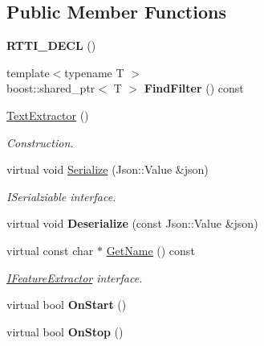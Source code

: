 \subsection*{Public Member Functions}
\begin{DoxyCompactItemize}
\item 
\mbox{\label{class_text_extractor_aa683fd90846e980a8fe1f398a93c5c96}} 
{\bfseries R\+T\+T\+I\+\_\+\+D\+E\+CL} ()
\item 
\mbox{\label{class_text_extractor_a918f1efb0112c641aa77057f6a618f90}} 
{\footnotesize template$<$typename T $>$ }\\boost\+::shared\+\_\+ptr$<$ T $>$ {\bfseries Find\+Filter} () const
\item 
\mbox{\label{class_text_extractor_aa42892751754454934baa10bab2ad9f3}} 
\hyperlink{class_text_extractor_aa42892751754454934baa10bab2ad9f3}{Text\+Extractor} ()
\begin{DoxyCompactList}\small\item\em Construction. \end{DoxyCompactList}\item 
\mbox{\label{class_text_extractor_a8e5b4a68bc0c81bd0c87acf280c210a3}} 
virtual void \hyperlink{class_text_extractor_a8e5b4a68bc0c81bd0c87acf280c210a3}{Serialize} (Json\+::\+Value \&json)
\begin{DoxyCompactList}\small\item\em I\+Serialziable interface. \end{DoxyCompactList}\item 
\mbox{\label{class_text_extractor_a638a7f09a4083d703c384f1c6aaa7bb3}} 
virtual void {\bfseries Deserialize} (const Json\+::\+Value \&json)
\item 
\mbox{\label{class_text_extractor_aa47be2f759d68326f3a55cd318db6360}} 
virtual const char $\ast$ \hyperlink{class_text_extractor_aa47be2f759d68326f3a55cd318db6360}{Get\+Name} () const
\begin{DoxyCompactList}\small\item\em \hyperlink{class_i_feature_extractor}{I\+Feature\+Extractor} interface. \end{DoxyCompactList}\item 
\mbox{\label{class_text_extractor_a875edec706a2cb1646b2524c03e88cd8}} 
virtual bool {\bfseries On\+Start} ()
\item 
\mbox{\label{class_text_extractor_a5f5c0688ade89372ad055c6879c05ab0}} 
virtual bool {\bfseries On\+Stop} ()
\end{DoxyCompactItemize}
